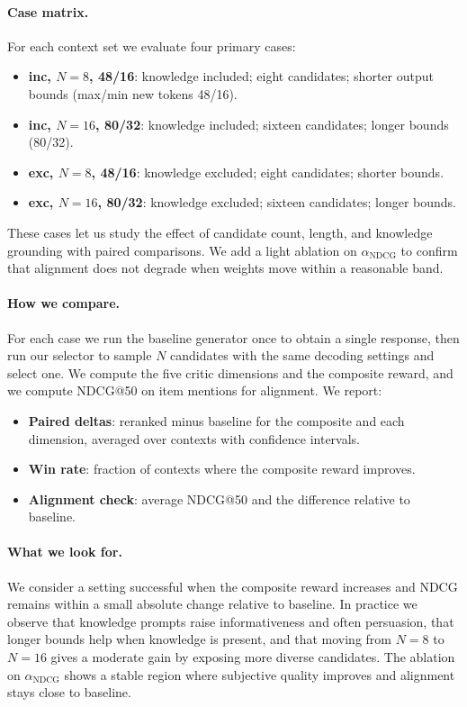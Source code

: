 \documentclass[12pt]{article}
\begin{document}
  \paragraph{Case matrix.} For each context set we evaluate four primary cases:
  \begin{itemize}[leftmargin=*]
    \item \textbf{inc, $N=8$, 48/16}: knowledge included; eight candidates; shorter output bounds (max/min new tokens 48/16).
    \item \textbf{inc, $N=16$, 80/32}: knowledge included; sixteen candidates; longer bounds (80/32).
    \item \textbf{exc, $N=8$, 48/16}: knowledge excluded; eight candidates; shorter bounds.
    \item \textbf{exc, $N=16$, 80/32}: knowledge excluded; sixteen candidates; longer bounds.
  \end{itemize}
  These cases let us study the effect of candidate count, length, and knowledge grounding with paired comparisons. We add a light ablation on $\alpha_{\mathrm{NDCG}}$ to confirm that alignment does not degrade when weights move within a reasonable band.
  
  \paragraph{How we compare.} For each case we run the baseline generator once to obtain a single response, then run our selector to sample $N$ candidates with the same decoding settings and select one. We compute the five critic dimensions and the composite reward, and we compute NDCG@50 on item mentions for alignment. We report:
  \begin{itemize}[leftmargin=*]
    \item \textbf{Paired deltas}: reranked minus baseline for the composite and each dimension, averaged over contexts with confidence intervals.
    \item \textbf{Win rate}: fraction of contexts where the composite reward improves.
    \item \textbf{Alignment check}: average NDCG@50 and the difference relative to baseline.
  \end{itemize}
  
  \paragraph{What we look for.} We consider a setting successful when the composite reward increases and NDCG remains within a small absolute change relative to baseline. In practice we observe that knowledge prompts raise informativeness and often persuasion, that longer bounds help when knowledge is present, and that moving from $N=8$ to $N=16$ gives a moderate gain by exposing more diverse candidates. The ablation on $\alpha_{\mathrm{NDCG}}$ shows a stable region where subjective quality improves and alignment stays close to baseline.
  
\end{document}
